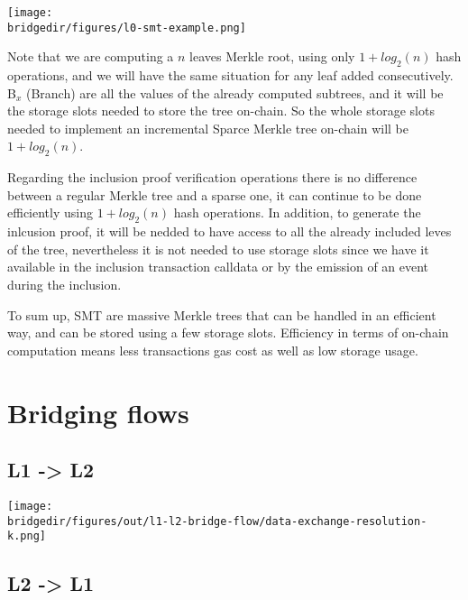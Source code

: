 \begin{center}
	\texttt{[image: \\bridgedir/figures/l0-smt-example.png]}
	
\end{center}

Note that we are computing a $n$ leaves Merkle root, using only $1 + log_{2}(n)$ hash operations, and we will have the same situation for any leaf added consecutively. B$_{x} $ (Branch) are all the values of the already computed subtrees, and it will be the storage slots needed to store the tree on-chain. So the whole storage slots needed to implement an incremental Sparce Merkle tree on-chain will be $ 1 + log_{2} (n) $.

Regarding the inclusion proof verification operations there is no difference between a regular Merkle tree and a sparse one, it can continue to be done efficiently using $1 + log_{2}(n)$ hash operations. In addition, to generate the inlcusion proof, it will be nedded to have access to all the already included leves of the tree, nevertheless it is not needed to use storage slots since we have it available in the inclusion transaction calldata or by the emission of an event during the inclusion.

To sum up, SMT are massive Merkle trees that can be handled in an efficient way, and can be stored using a few storage slots. Efficiency in terms of on-chain computation means less transactions gas cost as well as low storage usage.

\section{Bridging flows}
\subsection{L1 -> L2}

\begin{center}
	\texttt{[image: \\bridgedir/figures/out/l1-l2-bridge-flow/data-exchange-resolution-k.png]}
	
	
\end{center}

\subsection{L2 -> L1}

